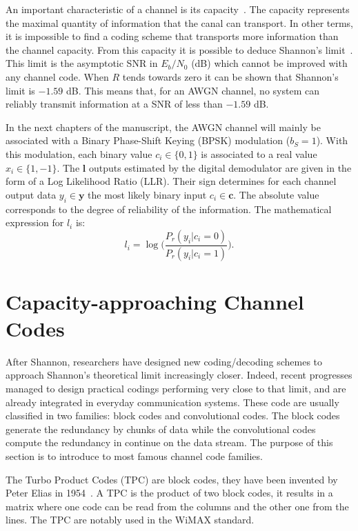 An important characteristic of a channel is its capacity~\cite{Ryan2009}. The
capacity represents the maximal quantity of information that the canal can
transport. In other terms, it is impossible to find a coding scheme that
transports more information than the channel capacity.
From this capacity it is possible to deduce Shannon's limit~\cite{Shannon1948}.
This limit is the asymptotic SNR in $E_b/N_0$ (dB) which cannot be improved with
any channel code. When $R$ tends towards zero it can be shown that Shannon's
limit is $-1.59$ dB. This means that, for an AWGN channel, no system can
reliably transmit information at a SNR of less than $-1.59$ dB.

In the next chapters of the manuscript, the AWGN channel will mainly be
associated with a Binary Phase-Shift Keying (BPSK) modulation ($b_S = 1$). With
this modulation, each binary value $c_i \in \{0,1\}$ is associated to a real
value $x_i \in \{1,-1\}.$ The $\bm{l}$ outputs estimated by the digital
demodulator are given in the form of a Log Likelihood Ratio (LLR). Their sign
determines for each channel output data $y_i \in \bm{y}$ the most likely binary
input $c_i \in \bm{c}$. The absolute value corresponds to the degree of
reliability of the information. The mathematical expression for $l_i$ is:
\begin{equation*}
l_i = \log{\Big(\frac{P_r(y_i|c_i = 0)}{P_r(y_i|c_i = 1)}\Big)}.
\end{equation*}

\section{Capacity-approaching Channel Codes}

After Shannon, researchers have designed new coding/decoding schemes to approach
Shannon's theoretical limit increasingly closer. Indeed, recent progresses
managed to design practical codings performing very close to that limit, and are
already integrated in everyday communication systems. These code are usually
classified in two families: block codes and convolutional codes. The block codes
generate the redundancy by chunks of data while the convolutional codes compute
the redundancy in continue on the data stream. The purpose of this section is to
introduce to most famous channel code families.

The Turbo Product Codes (TPC) are block codes, they have been invented by Peter
Elias in 1954~\cite{Elias1954}. A TPC is the product of two block codes, it
results in a matrix where one code can be read from the columns and the other
one from the lines. The TPC are notably used in the WiMAX standard.

